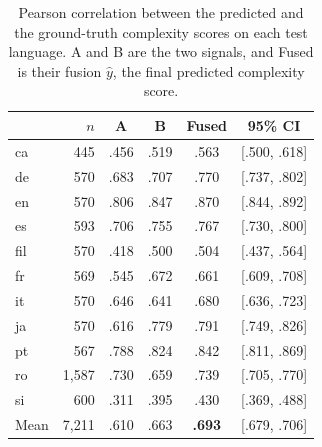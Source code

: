 \begin{table}[t]
\centering
\small
\setlength{\tabcolsep}{4pt}
\begin{tabular}{lrcccc}
\toprule
 & $n$ & A & B & Fused & 95\% CI \\
\midrule
ca  &   445 & .456 & .519 & .563 & [.500, .618] \\ %
de  &   570 & .683 & .707 & .770 & [.737, .802] \\ %
en  &   570 & .806 & .847 & .870 & [.844, .892] \\ %
es  &   593 & .706 & .755 & .767 & [.730, .800] \\ %
fil &   570 & .418 & .500 & .504 & [.437, .564] \\ %
fr  &   569 & .545 & .672 & .661 & [.609, .708] \\ %
it  &   570 & .646 & .641 & .680 & [.636, .723] \\ %
ja  &   570 & .616 & .779 & .791 & [.749, .826] \\ %
pt  &   567 & .788 & .824 & .842 & [.811, .869] \\ %
ro  & 1{,}587 & .730 & .659 & .739 & [.705, .770] \\ %
si  &   600 & .311 & .395 & .430 & [.369, .488] \\ %
\midrule
Mean & 7{,}211 & .610 & .663 & \textbf{.693} & [.679, .706] \\ %
\bottomrule
\end{tabular}
\caption{Pearson correlation between the predicted and the ground-truth complexity scores on each
test language. A and B are the two signals, and Fused is their fusion $\hat{y}$, the final
predicted complexity score.}
\label{tab:per-language}
\end{table}

